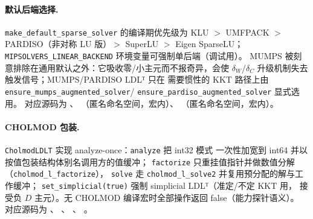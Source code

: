 \paragraph{默认后端选择.}
\texttt{make\_default\_sparse\_solver} 的编译期优先级为
KLU $>$ UMFPACK $>$ PARDISO（非对称 LU 版）$>$ SuperLU $>$ Eigen SparseLU；
\texttt{MIPSOLVERS\_LINEAR\_BACKEND} 环境变量可强制单后端（调试用）。
MUMPS 被刻意排除在通用默认之外：它吸收零/小主元而不报奇异，会使
$\delta_W$/$\delta_C$ 升级机制失去触发信号；MUMPS/PARDISO LDLᵀ 只在
需要惯性的 KKT 路径上由 \texttt{ensure\_mumps\_augmented\_solver}/
\texttt{ensure\_pardiso\_augmented\_solver} 显式选用。
对应源码为 、
（匿名命名空间，宏内）、
（匿名命名空间，宏内）。

\paragraph{CHOLMOD 包装.}
\texttt{CholmodLDLT} 实现 analyze-once：\texttt{analyze} 把 int32 模式
一次性加宽到 int64 并以按值包装结构体别名调用方的值缓冲；
\texttt{factorize} 只重挂值指针并做数值分解（\texttt{cholmod\_l\_factorize}），
\texttt{solve} 走 \texttt{cholmod\_l\_solve2} 并复用预分配的解与工作缓冲；
\texttt{set\_simplicial(true)} 强制 simplicial LDLᵀ（准定/不定 KKT 用，
接受负 $D$ 主元）。无 CHOLMOD 编译宏时全部操作返回 false（能力探针语义）。
对应源码为 、
、
、
。

